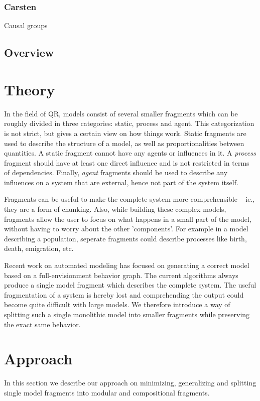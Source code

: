 \documentclass{article}
\begin{document}
\subsubsection{Carsten}
Causal groups %

\subsection{Overview}

\section{Theory}

In the field of QR, models %
consist of
several smaller fragments which can be roughly divided in three categories:
static, process and agent. This categorization is not strict, but gives
a certain view on how things work. Static fragments are used to describe the
structure of a model, as well as proportionalities between quantities. A static
fragment cannot have any agents or influences in it. A \emph{process} fragment
should have at least one direct influence and is not restricted in terms of dependencies. %
Finally, \emph{agent} fragments should be used to describe any influences on a
system that are external, hence not part of the system itself.

Fragments can be useful to make the complete system more comprehensible -- ie., they are a form of chunking. 
Also, while building these complex models, fragments allow the user to focus on
what happens in a small part of the model, without having to worry about the
other 'components'. For example in a model describing a population, seperate
fragments could describe processes like birth, death, emigration, etc.

Recent work on automated modeling \cite{buisman, vanweelden, liem} has focused
on generating a correct model based on a full-envisionment behavior graph. The
current algorithms always produce a single model fragment which describes the
complete system. The useful fragmentation of a system is hereby lost and
comprehending the output could become quite difficult with large models. We
therefore introduce a way of splitting such a single monolithic model into
smaller fragments while preserving the exact same behavior.

\section{Approach}
In this section we describe our approach on minimizing, generalizing and
splitting single model fragments into modular and compositional fragments.
\end{document}
